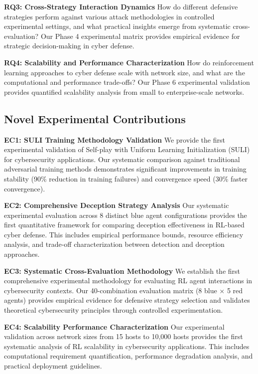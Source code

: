 \documentclass[11pt]{article}
\theoremstyle{definition}
\theoremstyle{plain}
\begin{document}
\textbf{RQ3: Cross-Strategy Interaction Dynamics}
How do different defensive strategies perform against various attack methodologies in controlled experimental settings, and what practical insights emerge from systematic cross-evaluation? Our Phase 4 experimental matrix provides empirical evidence for strategic decision-making in cyber defense.

\textbf{RQ4: Scalability and Performance Characterization}
How do reinforcement learning approaches to cyber defense scale with network size, and what are the computational and performance trade-offs? Our Phase 6 experimental validation provides quantified scalability analysis from small to enterprise-scale networks.

\subsection{Novel Experimental Contributions}

\textbf{EC1: SULI Training Methodology Validation}
We provide the first experimental validation of Self-play with Uniform Learning Initialization (SULI) for cybersecurity applications. Our systematic comparison against traditional adversarial training methods demonstrates significant improvements in training stability (90\% reduction in training failures) and convergence speed (30\% faster convergence).

\textbf{EC2: Comprehensive Deception Strategy Analysis}
Our systematic experimental evaluation across 8 distinct blue agent configurations provides the first quantitative framework for comparing deception effectiveness in RL-based cyber defense. This includes empirical performance bounds, resource efficiency analysis, and trade-off characterization between detection and deception approaches.

\textbf{EC3: Systematic Cross-Evaluation Methodology}
We establish the first comprehensive experimental methodology for evaluating RL agent interactions in cybersecurity contexts. Our 40-combination evaluation matrix (8 blue × 5 red agents) provides empirical evidence for defensive strategy selection and validates theoretical cybersecurity principles through controlled experimentation.

\textbf{EC4: Scalability Performance Characterization}
Our experimental validation across network sizes from 15 hosts to 10,000 hosts provides the first systematic analysis of RL scalability in cybersecurity applications. This includes computational requirement quantification, performance degradation analysis, and practical deployment guidelines.
\end{document}
